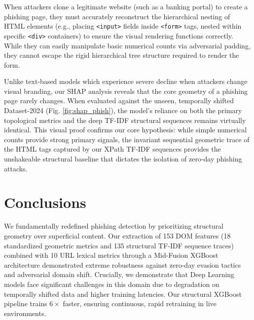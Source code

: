 \documentclass[conference]{IEEEtran}
\begin{document}
When attackers clone a legitimate website (such as a banking portal) to create a phishing page, they must accurately reconstruct the hierarchical nesting of HTML elements (e.g., placing \texttt{<input>} fields inside \texttt{<form>} tags, nested within specific \texttt{<div>} containers) to ensure the visual rendering functions correctly. While they can easily manipulate basic numerical counts via adversarial padding, they cannot escape the rigid hierarchical tree structure required to render the form. 

Unlike text-based models which experience severe decline when attackers change visual branding, our SHAP analysis reveals that the core geometry of a phishing page rarely changes. When evaluated against the unseen, temporally shifted Dataset-2024 (Fig. \ref{fig:shap_phish}), the model's reliance on both the primary topological metrics and the deep TF-IDF structural sequences remains virtually identical. This visual proof confirms our core hypothesis: while simple numerical counts provide strong primary signals, the invariant sequential geometric trace of the HTML tags captured by our XPath TF-IDF sequences provides the unshakeable structural baseline that dictates the isolation of zero-day phishing attacks.

\section{Conclusions}
We fundamentally redefined phishing detection by prioritizing structural geometry over superficial content. Our extraction of 153 DOM features (18 standardized geometric metrics and 135 structural TF-IDF sequence traces) combined with 10 URL lexical metrics through a Mid-Fusion XGBoost architecture demonstrated extreme robustness against zero-day evasion tactics and adversarial domain shift. Crucially, we demonstrate that Deep Learning models face significant challenges in this domain due to degradation on temporally shifted data and higher training latencies. Our structural XGBoost pipeline trains $6\times$ faster, ensuring continuous, rapid retraining in live environments.



\end{document}

